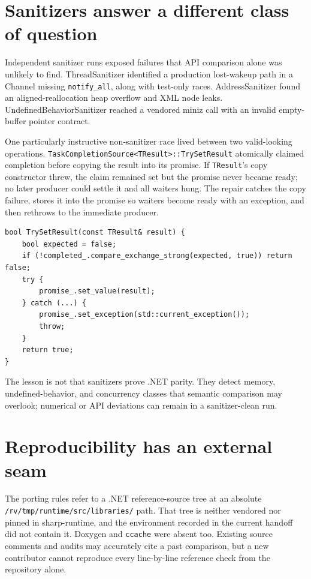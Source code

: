 \section{Sanitizers answer a different class of question}

Independent sanitizer runs exposed failures that API comparison alone was unlikely to find.
ThreadSanitizer identified a production lost-wakeup path in a Channel missing
\texttt{notify\_all}, along with test-only races. AddressSanitizer found an aligned-reallocation
heap overflow and XML node leaks. UndefinedBehaviorSanitizer reached a vendored miniz call with
an invalid empty-buffer pointer contract.

One particularly instructive non-sanitizer race lived between two valid-looking operations.
\texttt{TaskCompletionSource<TResult>::TrySetResult}%
atomically claimed completion before
copying the result into its promise. If \texttt{TResult}'s copy constructor threw, the claim
remained set but the promise never became ready; no later producer could settle it and all
waiters hung. The repair catches the copy failure, stores it into the promise so waiters become
ready with an exception, and then rethrows to the immediate producer.

\begin{lstlisting}
bool TrySetResult(const TResult& result) {
    bool expected = false;
    if (!completed_.compare_exchange_strong(expected, true)) return false;
    try {
        promise_.set_value(result);
    } catch (...) {
        promise_.set_exception(std::current_exception());
        throw;
    }
    return true;
}
\end{lstlisting}

The lesson is not that sanitizers prove .NET parity. They detect memory, undefined-behavior,
and concurrency classes that semantic comparison may overlook; numerical or API deviations can
remain in a sanitizer-clean run.

\section{Reproducibility has an external seam}

The porting rules refer to a .NET reference-source tree at an absolute
\texttt{/rv/tmp/runtime/src/libraries/} path. That tree is neither vendored nor pinned in
sharp-runtime, and the environment recorded in the current handoff did not contain it. Doxygen
and \texttt{ccache} were absent too. Existing source comments and audits may accurately cite a
past comparison, but a new contributor cannot reproduce every line-by-line reference check from
the repository alone.

